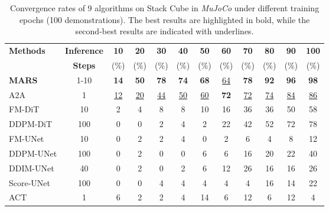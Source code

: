 \renewcommand*{\thetable}{S2}
\begin{table}[ht]
  \caption{Convergence rates of 9 algorithms on Stack Cube in \textit{MuJoCo} under different training epochs (100 demonstrations). The best results are highlighted in {bold}, while the second-best results are indicated with {underlines}.}
  \label{tab-mujoco}
  \vspace{3mm}
  \centering
  \small
  \setlength{\tabcolsep}{3.5pt} 
  \begin{tabular}{lccccccccccc}
    \toprule
    \textbf{Methods} & \textbf{Inference} & \textbf{10} & \textbf{20} & \textbf{30} & \textbf{40} & \textbf{50} & \textbf{60} & \textbf{70} & \textbf{80} & \textbf{90} & \textbf{100} \\
    & \textbf{Steps}  & (\%) & (\%) & (\%) & (\%) & (\%) & (\%) & (\%) & (\%) & (\%) & (\%) \\
    \midrule
    \textbf{MARS} & 1-10 & \textbf{14} & \textbf{50} & \textbf{78} & \textbf{74} & \textbf{68} & \underline{64} & \textbf{78} & \textbf{92} & \textbf{96} & \textbf{98} \\
    A2A                & 1 & \underline{12} & \underline{20} & \underline{44} & \underline{50} & \underline{60} & \textbf{72} & \underline{72} & \underline{74} & \underline{84} & \underline{86}\\
    FM-DiT              & 10 & 2 & 4 & 8 & 8 & 10 & 16 & 36 & 36 & 50 & 58\\
    DDPM-DiT            & 100 & 0 & 0 & 2 & 4 & 2 & 22 & 42 & 52 & 72 & 78\\
    FM-UNet             & 10 & 0 & 2 & 2 & 4 & 0 & 2 & 6 & 4 & 8 & 12\\
    DDPM-UNet           & 100 & 0 & 2 & 0 & 0 & 6 & 6 & 16 & 20 & 22 & 40\\
    DDIM-UNet           & 40 & 0 & 2 & 0 & 2 & 6 & 12 & 26 & 16 & 16 & 26\\
    Score-UNet          & 100 & 0 & 0 & 4 & 4 & 4 & 4 & 4 & 16 & 14 & 22\\
    ACT                 & 1 & 6 & 2 & 2  & 4 & 14 & 6 & 12 & 6 & 12 & 4 \\
    \bottomrule
  \end{tabular}
\end{table}

